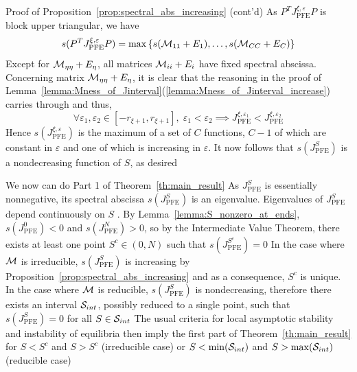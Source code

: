 \documentclass[aspectratio=169]{beamer}
\begin{document}
\begin{frame}{Proof of Proposition~\ref{prop:spectral_abs_increasing} (cont'd)}
	As $P^TJ_{\textrm{PFE}}^{\xi,\varepsilon}P$ is block upper triangular, we have
	\[
	s(P^TJ_{\textrm{PFE}}^{\xi,\varepsilon}P)
	=
	\max\left\{s(\M_{11}+E_1),\ldots,s(\M_{CC}+E_C)\right\}
	\]
	\vfill
	Except for $\M_{\eta\eta}+E_\eta$, all matrices $\M_{ii}+E_i$ have fixed spectral abscissa.
	Concerning matrix $\M_{\eta\eta}+E_\eta$, it is clear that the reasoning in the proof of Lemma~\ref{lemma:Mness_of_Jinterval}(\ref{lemma:Mness_of_Jinterval_increase}) carries through and thus,
	\[
	\forall \varepsilon_1,\varepsilon_2\in[-r_{\xi+1},r_{\xi+1}],
	\;
	\varepsilon_1<\varepsilon_2
	\implies
	J_{\textrm{PFE}}^{\xi,\varepsilon_1}
	< J_{\textrm{PFE}}^{\xi,\varepsilon_2}
	\]
	\vfill
	Hence $s(J_{\textrm{PFE}}^{\xi,\varepsilon})$ is the maximum of a set of $C$ functions, $C-1$ of which are constant in $\varepsilon$ and one of which is increasing in $\varepsilon$. 
	It now follows that $s(J_{\textrm{PFE}}^S)$ is a nondecreasing function of $S$, as desired
\end{frame}

\begin{frame}{We now can do Part 1 of Theorem~\ref{th:main_result}}
	As $J_{\textrm{PFE}}^S$ is essentially nonnegative, its spectral abscissa $s(J_{\textrm{PFE}}^S)$ is an eigenvalue.
	Eigenvalues of $J_{\textrm{PFE}}^S$ depend continuously on $S$ \cite[Theorem 2.4.9.2]{HornJohnson2013}. By Lemma~\ref{lemma:S_nonzero_at_ends}, $s(J_{\textrm{PFE}}^0)<0$ and $s(J_{\textrm{PFE}}^N)>0$, so by the Intermediate Value Theorem, there exists at least one point $S^c\in(0,N)$ such that $s(J_{\textrm{PFE}}^{S^c})=0$
	\vfill
	In the case where $\M$ is irreducible, $s(J_{\textrm{PFE}}^S)$ is increasing by Proposition~\ref{prop:spectral_abs_increasing} and as a consequence, $S^c$ is unique. In the case where $\M$ is reducible, $s(J_{\textrm{PFE}}^S)$ is nondecreasing, therefore there exists an interval $\S_{int}$, possibly reduced to a single point, such that $s(J_{\textrm{PFE}}^S)=0$ for all $S\in\S_{int}$
	\vfill
	The usual criteria for local asymptotic stability and instability of equilibria then imply the first part of Theorem~\ref{th:main_result} for $S<S^c$ and $S>S^c$ (irreducible case) or $S<\min(\S_{int})$ and $S>\max(\S_{int})$ (reducible case)
\end{frame}
\end{document}
